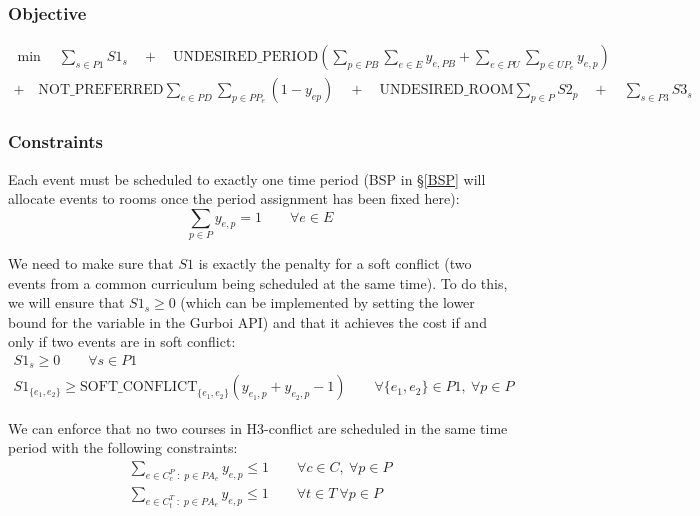 \documentclass{article}
\theoremstyle{plain}
\numberwithin{theorem}{section}
\numberwithin{example}{section}
\theoremstyle{definition}
\begin{document}
\subsubsection*{Objective}
\begin{multline}
    \min \quad \sum_{s \in P1} S1_s \quad + \quad \text{UNDESIRED\_PERIOD}
        \left( \sum_{p \in PB} \sum_{e \in E} y_{e, PB} +
        \sum_{e \in PU} \sum_{p \in UP_e} y_{e, p} \right) \\
    + \quad \text{NOT\_PREFERRED} \sum_{e \in PD} \sum_{p \in PP_e} (1 - y_{ep})
        \quad + \quad \text{UNDESIRED\_ROOM} \sum_{p \in P} S2_p \quad + \quad
        \sum_{s \in P3} S3_s
\end{multline}

\subsubsection*{Constraints}
Each event must be scheduled to exactly one time period (BSP in \S\ref{BSP} will
allocate events to rooms once the period assignment has been fixed here):
\begin{equation}
    \sum_{p \in P} y_{e,p} = 1 \qquad \forall e \in E
\end{equation}

We need to make sure that $S1$ is exactly the penalty for a soft conflict (two
events from a common curriculum being scheduled at the same time). To do this,
we will ensure that $S1_s \geq 0$ (which can be implemented by setting the lower
bound for the variable in the Gurboi API) and that it achieves the cost if and
only if two events are in soft conflict:
\begin{gather}
    S1_s \geq 0 \qquad \forall s \in P1 \\
    S1_{\{e_1, e_2\}} \geq \text{SOFT\_CONFLICT}_{\{e_1, e_2\}}
        (y_{e_1, p} + y_{e_2, p} - 1)
        \qquad \forall \{e_1, e_2\} \in P1, \ \forall p \in P
\end{gather}

We can enforce that no two courses in H3-conflict are scheduled in the same time
period with the following constraints:
\begin{gather}
    \sum_{e \in C^P_c \; : \; p \in PA_e} y_{e,p} \leq 1
        \qquad \forall c \in C, \ \forall p \in P \\
    \sum_{e \in C^T_t \; : \; p \in PA_e} y_{e, p} \leq 1
        \qquad \forall t \in T \ \forall p \in P
\end{gather}
\end{document}
